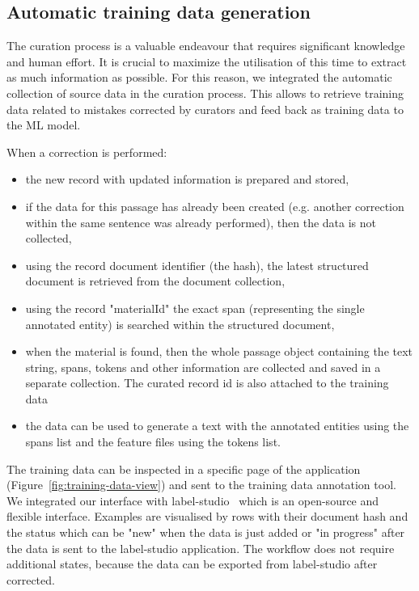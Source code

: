 \documentclass[a4paper]{article}
\begin{document}
\subsection{Automatic training data generation}
\label{subsec:feedback-loop-training-data}
The curation process is a valuable endeavour that requires significant knowledge and human effort. It is crucial to maximize the utilisation of this time to extract as much information as possible. 
For this reason, we integrated the automatic collection of source data in the curation process. This allows to retrieve training data related to mistakes corrected by curators and  feed back as training data to the ML model. 

When a correction is performed:
\begin{itemize}
    \item the new record with updated information is prepared and stored, 
    \item if the data for this passage has already been created (e.g. another correction within the same sentence was already performed), then the data is not collected,
    \item using the record document identifier (the hash), the latest structured document is retrieved from the document collection,
    \item using the record "materialId" the exact span (representing the single annotated entity) is searched within the structured document,
    \item when the material is found, then the whole passage object containing the text string, spans, tokens and other information are collected and saved in a separate collection. The curated record id is also attached to the training data 
    \item the data can be used to generate a text with the annotated entities using the spans list and the feature files using the tokens list.
\end{itemize}

The training data can be inspected in a specific page of the application (Figure~\ref{fig:training-data-view}) and sent to the training data annotation tool. We integrated our interface with label-studio~\cite{Label_Studio} which is an open-source and flexible interface. 
Examples are visualised by rows with their document hash and the status which can be "new" when the data is just added or "in progress" after the data is sent to the label-studio application. 
The workflow does not require additional states, because the data can be exported from label-studio after corrected. 
\end{document}
